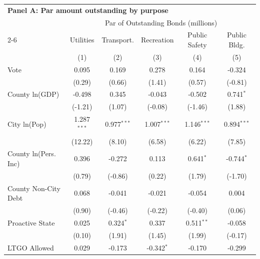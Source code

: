 \begingroup
\centering
\begin{tabular*}{\textwidth}{@{\extracolsep{\fill}}lccccc}
\multicolumn{6}{l}{\textbf{Panel A: Par amount outstanding by purpose}}\\

\addlinespace
   \toprule
    & \multicolumn{5}{c}{Par of Outstanding Bonds (millions)}\\
   \cmidrule(lr){2-6}
                               & Utilities     & Transport.     & Recreation     & Public Safety  & Public Bldg. \\   
                               & (1)           & (2)            & (3)            & (4)            & (5)\\  
   \midrule 
   Vote                        & 0.095         & 0.169          & 0.278          & 0.164          & -0.324\\   
                               & (0.29)       & (0.66)        & (1.41)        & (0.57)        & (-0.81)\\   
   County ln(GDP)              & -0.498        & 0.345          & -0.043         & -0.502         & 0.741$^{*}$\\   
                               & (-1.21)      & (1.07)        & (-0.08)       & (-1.46)       & (1.88)\\   
   City ln(Pop)                & 1.287$^{***}$ & 0.977$^{***}$  & 1.007$^{***}$  & 1.146$^{***}$  & 0.894$^{***}$\\   
                               & (12.22)      & (8.10)        & (6.58)        & (6.22)        & (7.85)\\   
   County ln(Pers. Inc)        & 0.396         & -0.272         & 0.113          & 0.641$^{*}$    & -0.744$^{*}$\\   
                               & (0.79)       & (-0.86)       & (0.22)        & (1.79)        & (-1.70)\\   
   County Non-City Debt        & 0.068         & -0.041         & -0.021         & -0.054         & 0.004\\   
                               & (0.90)       & (-0.46)       & (-0.22)       & (-0.40)       & (0.06)\\   
   Proactive State             & 0.025         & 0.324$^{*}$    & 0.337          & 0.511$^{**}$   & -0.058\\   
                               & (0.10)       & (1.91)        & (1.45)        & (1.99)        & (-0.17)\\   
   LTGO Allowed                & 0.029         & -0.173         & -0.342$^{*}$   & -0.170         & -0.299\\   

\end{tabular*}
